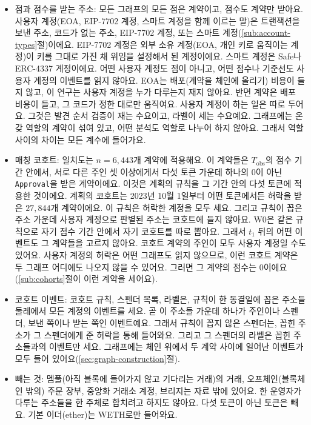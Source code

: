 \begin{itemize}
\item 점과 점수를 받는 주소: 모든 그래프의 모든 점은 계약이고, 점수도 계약만 받아요. 사용자 계정(EOA, EIP-7702 계정, 스마트 계정을 함께 이르는 말)은 트랜잭션을 보낸 주소, 코드가 없는 주소, EIP-7702 계정, 또는 스마트 계정(\ref{sub:account-types}절)이에요. EIP-7702 계정은 외부 소유 계정(EOA, 개인 키로 움직이는 계정)이 키를 그대로 가진 채 위임을 설정해서 된 계정이에요\parencite{buterin2024eip7702}. 스마트 계정은 Safe\parencite{safenddocs}나 ERC-4337 계정이에요\parencite{buterin2021erc4337}. 어떤 사용자 계정도 점이 아니고, 어떤 점수나 기준선도 사용자 계정의 이벤트를 읽지 않아요. EOA는 배포(계약을 체인에 올리기) 비용이 들지 않고, 이 연구는 사용자 계정을 누가 다루는지 재지 않아요. 반면 계약은 배포 비용이 들고, 그 코드가 정한 대로만 움직여요. 사용자 계정이 하는 일은 따로 두어요. 그것은 발견 순서 검증이 재는 수요이고, 라벨이 세는 수요예요. 그래프에는 온갖 역할의 계약이 섞여 있고, 어떤 분석도 역할로 나누어 하지 않아요. 그래서 역할 사이의 차이는 모든 계수에 들어가요.

\item 매칭 코호트: 일치도는 $n=6{,}443$개 계약에 적용해요. 이 계약들은 $T_{\mathrm{obs}}$의 점수 기간 안에서, 서로 다른 주인 셋 이상에게서 다섯 토큰 가운데 하나의 0이 아닌 \texttt{Approval}을 받은 계약이에요. 이것은 계획의 규칙을 그 기간 안의 다섯 토큰에 적용한 것이에요. 계획의 코호트는 2023년 10월 1일부터 어떤 토큰에서든 허락을 받은 $27{,}844$개 계약이에요. 이 규칙은 허락한 계정을 모두 세요. 그리고 규칙이 꼽은 주소 가운데 사용자 계정으로 판별된 주소는 코호트에 들지 않아요. W0은 같은 규칙으로 자기 점수 기간 안에서 자기 코호트를 따로 뽑아요. 그래서 $t_1$ 뒤의 어떤 이벤트도 그 계약들을 고르지 않아요. 코호트 계약의 주인이 모두 사용자 계정일 수도 있어요. 사용자 계정의 허락은 어떤 그래프도 읽지 않으므로, 이런 코호트 계약은 두 그래프 어디에도 나오지 않을 수 있어요. 그러면 그 계약의 점수는 $0$이에요(\ref{sub:cohorts}절이 이런 계약을 세어요).

\item 코호트 이벤트: 코호트 규칙, 스펜더 목록, 라벨은, 규칙이 한 동결일에 꼽은 주소들 둘레에서 모든 계정의 이벤트를 세요. 곧 이 주소들 가운데 하나가 주인이나 스펜더, 보낸 쪽이나 받는 쪽인 이벤트예요. 그래서 규칙이 꼽지 않은 스펜더는, 꼽힌 주소가 그 스펜더에게 준 허락을 통해 들어와요. 그리고 그 스펜더의 라벨은 꼽힌 주소들과의 이벤트만 세요. 그래프에는 체인 위에서 두 계약 사이에 일어난 이벤트가 모두 들어 있어요(\ref{sec:graph-construction}절).

\item 빼는 것: 멤풀(아직 블록에 들어가지 않고 기다리는 거래)의 거래, 오프체인(블록체인 밖의) 주문 장부, 중앙화 거래소 계정, 브리지는 자료 밖에 있어요. 한 운영자가 다루는 주소들을 한 주체로 합치려고 하지도 않아요. 다섯 토큰이 아닌 토큰은 빼요. 기본 이더(ether)는 WETH로만 들어와요.

\end{itemize}

